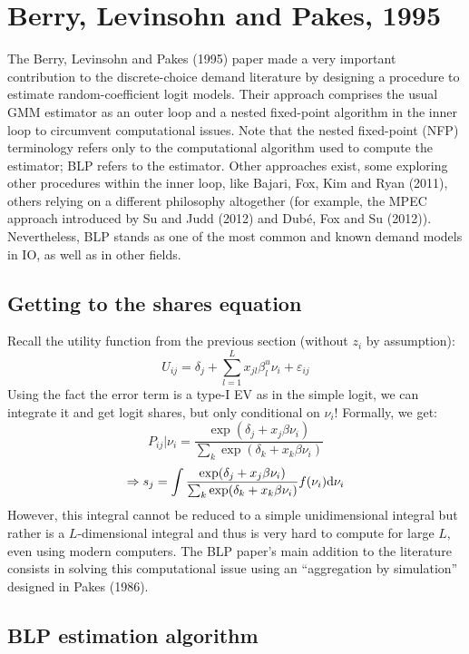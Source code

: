 \section{Berry, Levinsohn and Pakes, 1995}

The Berry, Levinsohn and Pakes (1995) paper made a very important contribution to the discrete-choice demand literature by designing a procedure to estimate random-coefficient logit models. Their approach comprises the usual GMM estimator as an outer loop and a nested fixed-point algorithm in the inner loop to circumvent computational issues. Note that the nested fixed-point (NFP) terminology refers only to the computational algorithm used to compute the estimator; BLP refers to the estimator. Other approaches exist, some exploring other procedures within the inner loop, like Bajari, Fox, Kim and Ryan (2011), others relying on a different philosophy altogether (for example, the MPEC approach introduced by Su and Judd (2012) and Dubé, Fox and Su (2012)). Nevertheless, BLP stands as one of the most common and known demand models in IO, as well as in other fields.

\subsection{Getting to the shares equation}

Recall the utility function from the previous section (without $z_i$ by assumption): $$ U_{ij} = \delta_j + \sum_{l=1}^L x_{jl}\beta_l^u \nu_i  + \varepsilon_{ij} $$ Using the fact the error term is a type-I EV as in the simple logit, we can integrate it and get logit shares, but only conditional on $\nu_i$! Formally, we get: $$ P_{ij}|\nu_i = \frac{\exp(\delta_j + x_{j}\beta \nu_i )}{\sum_k \exp(\delta_k + x_{k}\beta \nu_i )} $$ $$ \Rightarrow s_{j} = \int \frac{\exp(\delta_j + x_{j}\beta \nu_i )}{\sum_k \exp(\delta_k + x_{k}\beta \nu_i )} f(\nu_i)\mathrm{d} \nu_i $$ However, this integral cannot be reduced to a simple unidimensional integral but rather is a $L$-dimensional integral and thus is very hard to compute for large $L$, even using modern computers. The BLP paper's main addition to the literature consists in solving this computational issue using an ``aggregation by simulation'' designed in Pakes (1986). 

\subsection{BLP estimation algorithm}

